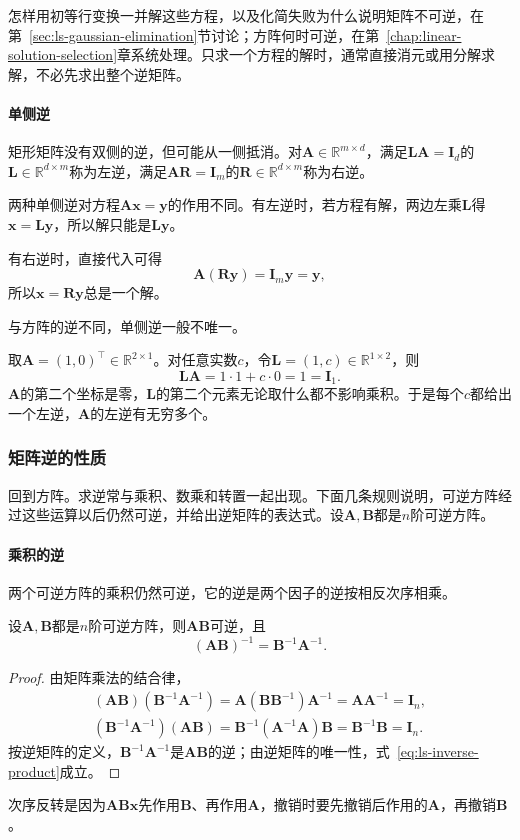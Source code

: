 怎样用初等行变换一并解这些方程，以及化简失败为什么说明矩阵不可逆，在第~\ref{sec:ls-gaussian-elimination}节讨论；方阵何时可逆，在第~\ref{chap:linear-solution-selection}章系统处理。只求一个方程的解时，通常直接消元或用分解求解，不必先求出整个逆矩阵。

\paragraph{单侧逆}
矩形矩阵没有双侧的逆，但可能从一侧抵消。对$\bm A\in\mathbb R^{m\times d}$，满足$\bm L\bm A=\bm I_d$的$\bm L\in\mathbb R^{d\times m}$称为左逆，满足$\bm A\bm R=\bm I_m$的$\bm R\in\mathbb R^{d\times m}$称为右逆。

两种单侧逆对方程$\bm A\bm x=\bm y$的作用不同。有左逆时，若方程有解，两边左乘$\bm L$得$\bm x=\bm L\bm y$，所以解只能是$\bm L\bm y$。

有右逆时，直接代入可得
\[
 \bm A(\bm R\bm y)=\bm I_m\bm y=\bm y,
\]
所以$\bm x=\bm R\bm y$总是一个解。

与方阵的逆不同，单侧逆一般不唯一。
\begin{example}[反例：左逆不唯一]
\label{ex:ls-left-inverse-not-unique}
取$\bm A=(1,0)^\top\in\mathbb R^{2\times1}$。对任意实数$c$，令$\bm L=(1,c)\in\mathbb R^{1\times2}$，则
\[
 \bm L\bm A=1\cdot1+c\cdot0=1=\bm I_1.
\]
$\bm A$的第二个坐标是零，$\bm L$的第二个元素无论取什么都不影响乘积。于是每个$c$都给出一个左逆，$\bm A$的左逆有无穷多个。
\end{example}

\subsubsection{矩阵逆的性质}
回到方阵。求逆常与乘积、数乘和转置一起出现。下面几条规则说明，可逆方阵经过这些运算以后仍然可逆，并给出逆矩阵的表达式。设$\bm A,\bm B$都是$n$阶可逆方阵。

\paragraph{乘积的逆}
两个可逆方阵的乘积仍然可逆，它的逆是两个因子的逆按相反次序相乘。
\begin{theorem}[乘积的逆]
\label{thm:ls-inverse-product}
设$\bm A,\bm B$都是$n$阶可逆方阵，则$\bm A\bm B$可逆，且
\begin{equation}
 (\bm A\bm B)^{-1}=\bm B^{-1}\bm A^{-1}.
 \label{eq:ls-inverse-product}
\end{equation}
\end{theorem}
\begin{proof}
由矩阵乘法的结合律，
\[
 \begin{gathered}
 (\bm A\bm B)(\bm B^{-1}\bm A^{-1})=\bm A(\bm B\bm B^{-1})\bm A^{-1}=\bm A\bm A^{-1}=\bm I_n,\\
 (\bm B^{-1}\bm A^{-1})(\bm A\bm B)=\bm B^{-1}(\bm A^{-1}\bm A)\bm B=\bm B^{-1}\bm B=\bm I_n.
 \end{gathered}
\]
按逆矩阵的定义，$\bm B^{-1}\bm A^{-1}$是$\bm A\bm B$的逆；由逆矩阵的唯一性，式~\eqref{eq:ls-inverse-product}成立。
\end{proof}
次序反转是因为$\bm A\bm B\bm x$先作用$\bm B$、再作用$\bm A$，撤销时要先撤销后作用的$\bm A$，再撤销$\bm B$。

